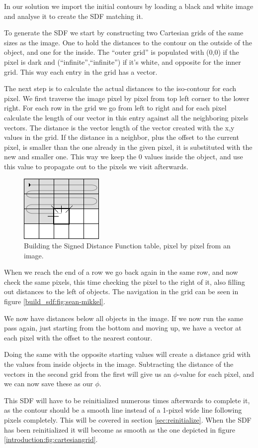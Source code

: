 In our solution we import the initial contours by loading a black and
white image and analyse it to create the SDF matching it. 

To generate the SDF we start by constructing two Cartesian grids of
the same sizes as the image. One to hold the distances to the contour
on the outside of the object, and one for the inside. The ``outer
grid'' is populated with (0,0) if the pixel is dark and
(``infinite'',``infinite'') if it's white, and opposite for the inner
grid. This way each entry in the grid has a vector.

The next step is to calculate the actual distances to the iso-contour
for each pixel. We first traverse the image pixel by pixel from top
left corner to the lower right. For each row in the grid we go from
left to right and for each pixel calculate the length of our vector in
this entry against all the neighboring pixels vectors. The distance is
the vector length of the vector created with the x,y values in the
grid. If the distance in a neighbor, plus the offset to the current
pixel, is smaller than the one already in the given pixel, it is
substituted with the new and smaller one. This way we keep the 0
values inside the object, and use this value to propagate out to the
pixels we visit afterwards.

\begin{figure}[htb]
  \centering
  \includegraphics[scale=0.8]{imgs/sean-mikkel.png}
  \caption{Building the Signed Distance Function table, pixel by pixel from an image.}
  \label{build_sdf:fig:sean-mikkel}
\end{figure}

When we reach the end of a row we go back again in the same row, and
now check the same pixels, this time checking the pixel to the right
of it, also filling out distances to the left of objects. The
navigation in the grid can be seen in
figure \vref{build_sdf:fig:sean-mikkel}.

We now have distances below all objects in the image. If we now run
the same pass again, just starting from the bottom and moving up, we
have a vector at each pixel with the offset to the nearest contour.

Doing the same with the opposite starting values will create a
distance grid with the values from inside objects in the
image. Subtracting the distance of the vectors in the second grid
from the first will give us an $\phi$-value for each pixel, and we can
now save these as our $\phi$.

This SDF will have to be reinitialized numerous times afterwards to
complete it, as the contour should be a smooth line instead of a 1-pixel
wide line following pixels completely. This will be covered in section \vref{sec:reinitialize}. When the SDF has been reinitialized it will become as smooth as the one depicted in figure \vref{introduction:fig:cartesiangrid}.



